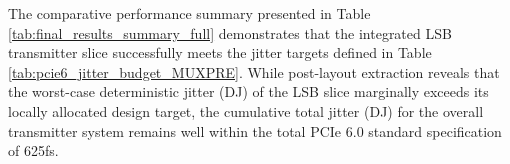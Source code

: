 The comparative performance summary presented in Table \ref{tab:final_results_summary_full} demonstrates that the integrated LSB transmitter slice successfully meets the jitter targets defined in Table \ref{tab:pcie6_jitter_budget_MUXPRE}. While post-layout extraction reveals that the worst-case deterministic jitter (DJ) of the LSB slice marginally exceeds its locally allocated design target, the cumulative total jitter (DJ) for the overall transmitter system remains well within the total PCIe 6.0 standard specification of 625fs.
